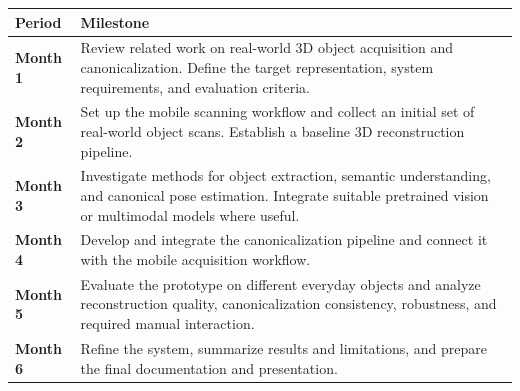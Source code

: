 \documentclass[11pt,a4paper]{article}
\begin{document}
\begin{tabularx}{\textwidth}{>{\bfseries}p{2.2cm} X}
\toprule
Period & Milestone \\
\midrule
Month 1 &
Review related work on real-world 3D object acquisition and canonicalization. Define the target representation, system requirements, and evaluation criteria. \\

Month 2 &
Set up the mobile scanning workflow and collect an initial set of real-world object scans. Establish a baseline 3D reconstruction pipeline. \\

Month 3 &
Investigate methods for object extraction, semantic understanding, and canonical pose estimation. Integrate suitable pretrained vision or multimodal models where useful. \\

Month 4 &
Develop and integrate the canonicalization pipeline and connect it with the mobile acquisition workflow. \\

Month 5 &
Evaluate the prototype on different everyday objects and analyze reconstruction quality, canonicalization consistency, robustness, and required manual interaction. \\

Month 6 &
Refine the system, summarize results and limitations, and prepare the final documentation and presentation. \\
\bottomrule
\end{tabularx}
\end{document}
